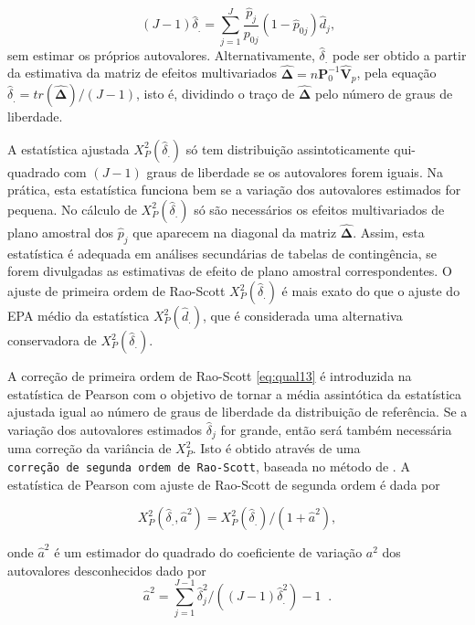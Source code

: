 \documentclass[]{book}
\theoremstyle{definition}
\theoremstyle{definition}
\theoremstyle{definition}
\theoremstyle{remark}
\begin{document}
\[
\left( J-1\right) \hat{\delta}_{.}=\sum_{j=1}^J\frac{\hat{p}_{j}}{p_{0j}}\left( 1-\hat{p}_{0j}\right)
 \hat{d}_{j}\mbox{,} 
\] sem estimar os próprios autovalores. Alternativamente,
\(\hat{\delta}_{.}\) pode ser obtido a partir da estimativa da matriz de
efeitos multivariados
\(\mathbf{\hat{\Delta}}=n\mathbf{P}_{0}^{-1}\mathbf{\hat{V}}_{p}\), pela
equação
\(\hat{\delta}_{.}=tr\left( \mathbf{\hat{\Delta}}\right) /\left(J-1\right)\),
isto é, dividindo o traço de \(\mathbf{\hat{\Delta}}\) pelo número de
graus de liberdade.

A estatística ajustada \(X_{P}^{2}\left( \hat{\delta}_{.}\right)\) só
tem distribuição assintoticamente qui-quadrado com \(\left(J-1\right)\)
graus de liberdade se os autovalores forem iguais. Na prática, esta
estatística funciona bem se a variação dos autovalores estimados for
pequena. No cálculo de \(X_{P}^{2}\left( \hat{\delta}_{.}\right)\) só
são necessários os efeitos multivariados de plano amostral dos
\(\hat{p}_{j}\) que aparecem na diagonal da matriz
\(\mathbf{\hat{\Delta}}\). Assim, esta estatística é adequada em
análises secundárias de tabelas de contingência, se forem divulgadas as
estimativas de efeito de plano amostral correspondentes. O ajuste de
primeira ordem de Rao-Scott \(X_{P}^{2}\left( \hat{\delta}_{.}\right)\)
é mais exato do que o ajuste do EPA médio da estatística
\(X_{P}^{2}\left( \hat{d}_{.}\right)\), que é considerada uma
alternativa conservadora de \(X_{P}^{2}\left( \hat{\delta}_{.}\right)\).

A correção de primeira ordem de Rao-Scott \eqref{eq:qual13} é introduzida
na estatística de Pearson com o objetivo de tornar a média assintótica
da estatística ajustada igual ao número de graus de liberdade da
distribuição de referência. Se a variação dos autovalores estimados
\(\hat{\delta}_{j}\) for grande, então será também necessária uma
correção da variância de \(X_{P}^{2}\). Isto é obtido através de uma
\texttt{correção\ de\ segunda\ ordem\ de\ Rao-Scott}, baseada no método
de \citep{sat}. A estatística de Pearson com ajuste de Rao-Scott de
segunda ordem é dada por

\begin{equation}
X_{P}^{2}\left( \hat{\delta}_{.},\hat{a}^{2}\right) =
X_{P}^{2}\left( \hat{\delta}_{.}\right) /\left( 1+\hat{a}^{2}\right) , 
 \label{eq:qual14}
\end{equation}

onde \(\hat{a}^{2}\) é um estimador do quadrado do coeficiente de
variação \(a^{2}\) dos autovalores desconhecidos dado por \[
\hat{a}^{2}=\sum_{j=1}^{J-1}\hat{\delta}_{j}^{2}/\left( \left( J-1\right)
 \hat{\delta}_{.}^{2}\right) -1\;\;. 
\]
\end{document}
